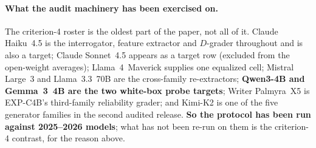 
\paragraph{What the audit machinery has been exercised on.} The criterion-4 roster is the oldest part of the paper, not all of it. Claude Haiku~4.5 is the interrogator, feature extractor and $D$-grader throughout and is also a target; Claude Sonnet~4.5 appears as a target row (excluded from the open-weight averages); Llama~4~Maverick supplies one equalized cell; Mistral Large~3 and Llama~3.3~70B are the cross-family re-extractors; \textbf{Qwen3-4B and Gemma~3~4B are the two white-box probe targets}; Writer Palmyra~X5 is EXP-C4B's third-family reliability grader; and Kimi-K2 is one of the five generator families in the second audited release. \textbf{So the protocol has been run against 2025--2026 models}; what has not been re-run on them is the criterion-4 contrast, for the reason above.

